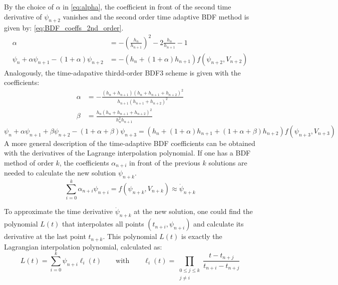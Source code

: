 By the choice of $\alpha$ in \autoref{eq:alpha}, the coefficient in front of the second time derivative of $\psi_{n+2}$ vanishes and the second order time adaptive BDF method is given by: \autoref{eq:BDF_coeffs_2nd_order}. 
\begin{align}
    \label{eq:alpha}
    \alpha &= -\left(\frac{h_n}{h_{n+1}}\right)^2 - 2\frac{h_n}{h_{n+1}} - 1 \\
	\label{eq:BDF_coeffs_2nd_order}
    \psi_n + \alpha \psi_{n+1} -(1+\alpha)\psi_{n+2} &= -\left(h_n + (1+\alpha)h_{n+1}\right)f(\psi_{n+2}, V_{n+2})
\end{align}
Analogously, the time-adapative thirdd-order BDF3 scheme is given with the coefficients: 
\begin{align}
    \alpha &= -\frac{\left(h_n+h_{n+1}\right)\left(h_n+h_{n+1}+h_{n+2}\right)^2}
    {h_{n+1}\left(h_{n+1}+h_{n+2}\right)^2} \\
    \beta &= \frac{h_n\left(h_n+h_{n+1}+h_{n+2}\right)^2}
    {h_{n}^2h_{n+1}}
\end{align}
\begin{equation}
	\label{eq:BDF_coeffs_3rd_order}
    \psi_n + \alpha \psi_{n+1} + \beta \psi_{n+2} -(1+\alpha+\beta)\psi_{n+3} = \left(h_n + (1+\alpha)h_{n+1} + (1+\alpha+\beta)h_{n+2}\right)f(\psi_{n+3},V_{n+3})
\end{equation}
A more general description of the time-adaptive BDF coefficients can be obtained with the derivatives of the Lagrange interpolation polynomial. If one has a BDF method of order $k$, the coefficients $\alpha_{n+i}$ in front of the previous $k$ solutions are needed to calculate the new solution $\psi_{n+k}$.
\begin{equation}
	\sum_{i=0}^{k}\alpha_{n+i}\psi_{n+i} = f(\psi_{n+k},V_{n+k}) \approx \dot{\psi}_{n+k}
\end{equation} 

To approximate the time derivative $\dot{\psi}_{n+k}$ at the new solution, one could find the polynomial $L(t)$ that interpolates all points $(t_{n+i}, \psi_{n+i})$ and calculate its derivative at the last point $t_{n+k}$. This polynomial $L(t)$ is exactly the Lagrangian interpolation polynomial, calculated as:
\begin{equation}
	L(t) = \sum_{i=0}^{k}\psi_{n+i}\ell_i(t) \qquad\text{with}\qquad \ell_i(t) = \prod_{\substack{0\le j\le k \\j \ne i}}\frac{t-t_{n+j}}{t_{n+i}-t_{n+j}}
\end{equation}

